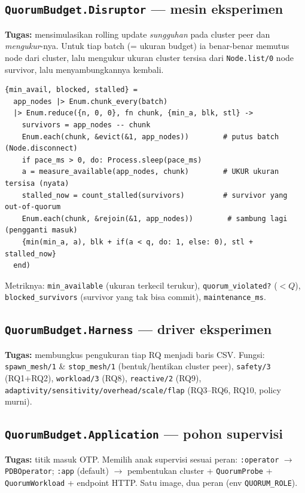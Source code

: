 \documentclass[11pt]{article}
\newcommand{\code}[1]{\texttt{\small #1}}
\begin{document}
\subsection{\texttt{QuorumBudget.Disruptor} --- mesin eksperimen}
\label{sec:mod-disruptor}
\textbf{Tugas:} mensimulasikan rolling update \emph{sungguhan} pada cluster peer dan
\emph{mengukur}-nya. Untuk tiap batch (= ukuran budget) ia benar-benar memutus node dari cluster, lalu
mengukur ukuran cluster tersisa dari \code{Node.list/0} node survivor, lalu menyambungkannya kembali.
\begin{lstlisting}[style=ex]
{min_avail, blocked, stalled} =
  app_nodes |> Enum.chunk_every(batch)
  |> Enum.reduce({n, 0, 0}, fn chunk, {min_a, blk, stl} ->
    survivors = app_nodes -- chunk
    Enum.each(chunk, &evict(&1, app_nodes))        # putus batch (Node.disconnect)
    if pace_ms > 0, do: Process.sleep(pace_ms)
    a = measure_available(app_nodes, chunk)        # UKUR ukuran tersisa (nyata)
    stalled_now = count_stalled(survivors)         # survivor yang out-of-quorum
    Enum.each(chunk, &rejoin(&1, app_nodes))        # sambung lagi (pengganti masuk)
    {min(min_a, a), blk + if(a < q, do: 1, else: 0), stl + stalled_now}
  end)
\end{lstlisting}
Metriknya: \code{min\_available} (ukuran terkecil terukur), \code{quorum\_violated?} ($<Q$),
\code{blocked\_survivors} (survivor yang tak bisa commit), \code{maintenance\_ms}.

\subsection{\texttt{QuorumBudget.Harness} --- driver eksperimen}
\label{sec:mod-harness}
\textbf{Tugas:} membungkus pengukuran tiap RQ menjadi baris CSV. Fungsi: \code{spawn\_mesh/1} \&
\code{stop\_mesh/1} (bentuk/hentikan cluster peer), \code{safety/3} (RQ1+RQ2), \code{workload/3} (RQ8),
\code{reactive/2} (RQ9), \code{adaptivity/sensitivity/overhead/scale/flap} (RQ3--RQ6, RQ10, policy
murni).

\subsection{\texttt{QuorumBudget.Application} --- pohon supervisi}
\textbf{Tugas:} titik masuk OTP. Memilih anak supervisi sesuai peran: \code{:operator} $\rightarrow$
\code{PDBOperator}; \code{:app} (default) $\rightarrow$ pembentukan cluster + \code{QuorumProbe} +
\code{QuorumWorkload} + endpoint HTTP. Satu image, dua peran (env \code{QUORUM\_ROLE}).
\end{document}
